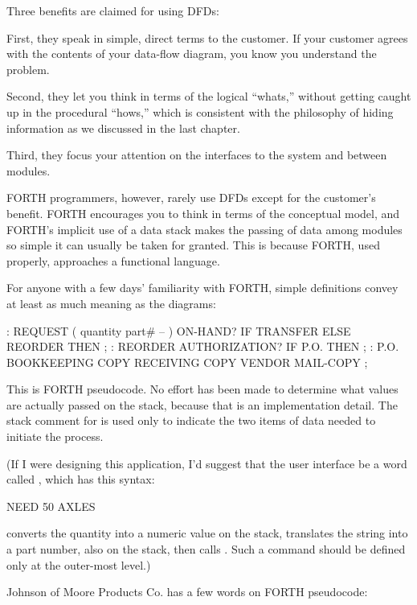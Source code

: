 Three benefits are claimed for using DFDs:

First, they speak in simple, direct terms to the customer. If your
customer agrees with the contents of your data-flow diagram, you know
you understand the problem.

Second, they let you think in terms of the logical ``whats,'' without
getting caught up in the procedural ``hows,'' which is consistent with
the philosophy of hiding information as we discussed in the last chapter.

Third, they focus your attention on the interfaces to the system and
between modules.

FORTH programmers, however, rarely use DFDs except for the customer's
benefit. FORTH encourages you to think in terms of the conceptual
model, and FORTH's implicit use of a data stack makes the passing of
data among modules so simple it can usually be taken for granted.
This is because FORTH, used properly, approaches a functional language.

For anyone with a few days' familiarity with FORTH, simple definitions
convey at least as much meaning as the diagrams:

\begin{Code}
: REQUEST  ( quantity part# -- )
   ON-HAND?  IF  TRANSFER  ELSE  REORDER  THEN ;
: REORDER   AUTHORIZATION?  IF  P.O.  THEN ;
: P.O.   BOOKKEEPING COPY   RECEIVING COPY
   VENDOR MAIL-COPY ;
\end{Code}
This is FORTH pseudocode. No effort has been made to determine what
values are actually passed on the stack, because that is an
implementation detail. The stack comment for  is used
only to indicate the two items of data needed to initiate the process.

(If I were designing this application, I'd suggest that the user
interface be a word called , which has this syntax:

\begin{Code}
NEED 50 AXLES
\end{Code}

\noindent {} converts the quantity into a numeric value on
the stack, translates the string  into a part number,
also on the stack, then calls . Such a command should
be defined only at the outer-most level.)

\bigskip\blackline{2ex}
\noindent Johnson of Moore Products Co. has a few words on FORTH pseudocode:

